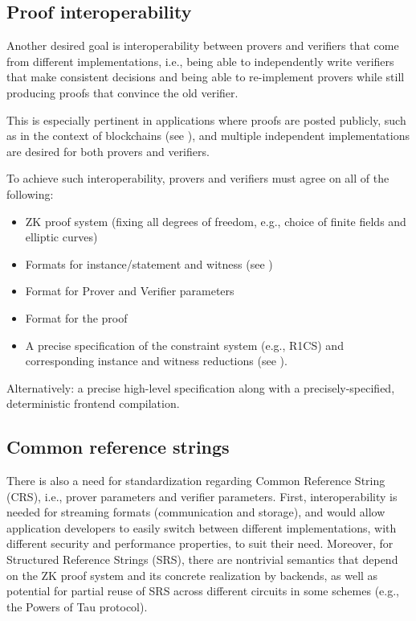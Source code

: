 \subsection{Proof interoperability}
\label{implem:interoperability:proof}

Another desired goal is interoperability between provers and verifiers that come from different implementations, i.e., being able to independently write verifiers that make consistent decisions and being able to re-implement provers while still producing proofs that convince the old verifier.

This is especially pertinent in applications where proofs are posted publicly, such as in the context of blockchains (see ), and multiple independent implementations are desired for both provers and verifiers.

To achieve such interoperability, provers and verifiers must agree on all of the following:
\begin{itemize}
    \item ZK proof system (fixing all degrees of freedom, e.g., choice of finite fields and elliptic curves)
    \item Formats for instance/statement and witness (see )
    \item Format for Prover and Verifier parameters
    \item Format for the proof
    \item A precise specification of the constraint system (e.g., R1CS) and corresponding instance and witness reductions (see ).
\end{itemize}

Alternatively: a precise high-level specification along with a precisely-specified, deterministic frontend compilation.


\subsection{Common reference strings}
\label{implem:interoperability:CRS}

There is also a need for standardization regarding Common Reference String (CRS), i.e., prover parameters and verifier parameters. 
First, interoperability is needed for streaming formats (communication and storage), and would allow application developers to easily switch between different implementations, with different security and performance properties, to suit their need.
Moreover, for Structured Reference Strings (SRS), there are nontrivial semantics that depend on the ZK proof system and its concrete realization by backends, as well as potential for partial reuse of SRS across different circuits in some schemes (e.g., the Powers of Tau protocol). 
